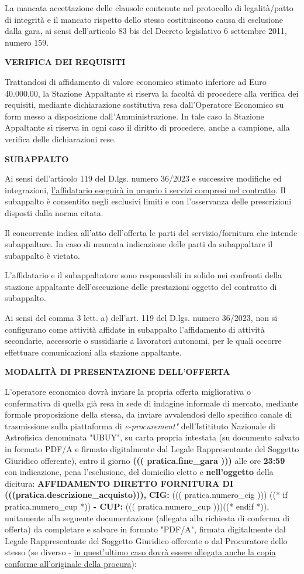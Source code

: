 La mancata accettazione delle clausole contenute nel protocollo
di legalità/patto di integrità e il mancato rispetto dello stesso
costituiscono causa di esclusione dalla gara, ai sensi dell'articolo
83 bis del Decreto legislativo 6 settembre 2011, numero 159.

\textbf{VERIFICA DEI REQUISITI}

Trattandosi di affidamento di valore economico stimato inferiore
ad Euro 40.000,00, la Stazione Appaltante si riserva la facoltà
di procedere alla verifica dei requisiti, mediante dichiarazione
sostitutiva resa dall'Operatore Economico su form messo a disposizione
dall'Amministrazione. In tale caso la Stazione Appaltante si riserva
in ogni caso il diritto di procedere, anche a campione, alla verifica
delle dichiarazioni rese.

\textbf{SUBAPPALTO}

Ai sensi dell'articolo 119 del D.lgs. numero 36/2023 e successive
modifiche ed integrazioni,
\ul{l'affidatario eseguir\`a in proprio i servizi compresi nel
contratto}. Il subappalto è consentito negli esclusivi limiti e con
l'osservanza delle prescrizioni disposti dalla norma citata.

Il concorrente indica all'atto dell'offerta le parti del
servizio/fornitura che intende subappaltare. In caso di mancata
indicazione delle parti da subappaltare il subappalto è vietato. 

L'affidatario e il subappaltatore sono responsabili in solido nei
confronti della stazione appaltante dell'esecuzione delle prestazioni
oggetto del contratto di subappalto.

Ai sensi del comma 3 lett. a) dell'art. 119 del D.lgs. numero 36/2023,
non si configurano come attività affidate in subappalto l'affidamento
di attività secondarie, accessorie o sussidiarie a lavoratori autonomi,
per le quali occorre effettuare comunicazioni alla stazione appaltante.

\textbf{MODALITÀ DI PRESENTAZIONE DELL'OFFERTA}

L'operatore economico dovrà inviare la propria offerta migliorativa
o confermativa di quella già resa in sede di indagine informale
di mercato, mediante formale proposizione della stessa, da inviare
avvalendosi dello specifico canale di trasmissione sulla piattaforma
di \textit{e-procurement"} dell'Istitituto Nazionale di Astrofisica
denominata "UBUY", su carta propria intestata (su documento salvato
in formato PDF/A e firmato digitalmente dal Legale Rappresentante del
Soggetto Giuridico offerente), entro il giorno \textbf{((( pratica.fine_gara )))} alle ore
\textbf{23:59} con indicazione, pena l'esclusione, del domicilio
eletto e \textbf{nell'oggetto} della dicitura: \textbf{AFFIDAMENTO
DIRETTO FORNITURA DI (((pratica.descrizione_acquisto))),} \textbf{CIG:}
((( pratica.numero_cig )))%
((* if pratica.numero_cup *)) \textbf{ - CUP:} ((( pratica.numero_cup )))((* endif *)),
unitamente alla
seguente documentazione (allegata alla richiesta di conferma di offerta)
da completare e salvare in formato "PDF/A", firmata digitalmente dal
Legale Rappresentante del Soggetto Giuridico offerente o dal Procuratore
dello stesso (se diverso - \ul{in quest'ultimo caso dovr\`a essere
allegata anche la copia conforme all'originale della procura}):

